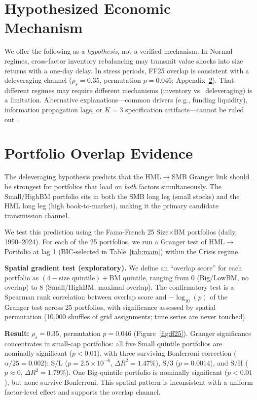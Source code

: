 \documentclass[sigconf,anonymous]{acmart}
\begin{document}
\appendix

\section{Hypothesized Economic Mechanism}
\label{app:mechanism}

We offer the following as a \emph{hypothesis}, not a verified mechanism.
In Normal regimes, cross-factor inventory rebalancing may transmit value
shocks into size returns with a one-day delay. In stress periods, FF25
overlap is consistent with a deleveraging channel ($\rho_s = 0.35$,
permutation $p = 0.046$; Appendix~\ref{app:overlap}). That different
regimes may require different mechanisms (inventory vs.\ deleveraging)
is a limitation. Alternative explanations---common drivers (e.g., funding
liquidity), information propagation lags, or $K = 3$ specification
artifacts---cannot be ruled out~\cite{greenwood2011stock}.

\section{Portfolio Overlap Evidence}
\label{app:overlap}

The deleveraging hypothesis predicts that the HML$\to$SMB Granger link should
be strongest for portfolios that load on \emph{both} factors simultaneously.
The Small\-/HighBM portfolio sits in both the SMB long leg (small stocks) and
the HML long leg (high book-to-market), making it the primary candidate
transmission channel.

We test this prediction using the Fama-French 25 Size$\times$BM portfolios
(daily, 1990--2024). For each of the 25 portfolios, we run a Granger test
of HML$\to$Portfolio at lag 1 (BIC-selected in Table~\ref{tab:main}) within
the Crisis regime.

\textbf{Spatial gradient test (exploratory).} We define an ``overlap score'' for each
portfolio as $(4 - \text{size quintile}) + \text{BM quintile}$, ranging from
0 (Big/LowBM, no overlap) to 8 (Small/HighBM, maximal overlap). The
confirmatory test is a Spearman rank correlation between overlap score and
$-\log_{10}(p)$ of the Granger test across 25 portfolios, with significance
assessed by spatial permutation (10{,}000 shuffles of grid assignments;
time series are never touched).

\textbf{Result:} $\rho_s = 0.35$, permutation $p = 0.046$
(Figure~\ref{fig:ff25}). Granger significance concentrates in small-cap
portfolios: all five Small quintile portfolios are nominally significant
($p < 0.01$), with three surviving Bonferroni correction ($\alpha/25 = 0.002$):
S/L ($p = 2.5 \times 10^{-6}$, $\Delta R^2 = 1.47\%$),
S/3 ($p = 0.0014$), and S/H ($p \approx 0$, $\Delta R^2 = 1.79\%$).
One Big-quintile portfolio is nominally significant ($p < 0.01$), but none
survive Bonferroni. This spatial pattern is inconsistent
with a uniform factor-level effect and supports the overlap channel.
\end{document}
